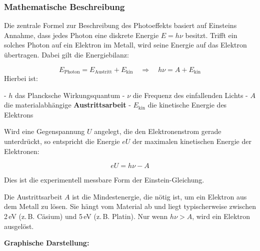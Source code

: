\subsubsection{Mathematische Beschreibung}

Die zentrale Formel zur Beschreibung des Photoeffekts basiert auf Einsteins Annahme, dass jedes Photon eine diskrete Energie \( E = h\nu \) besitzt. Trifft ein solches Photon auf ein Elektron im Metall, wird seine Energie auf das Elektron übertragen. Dabei gilt die Energiebilanz:

\[
E_{\text{Photon}} = E_{\text{Austritt}} + E_{\text{kin}}
\quad\Rightarrow\quad h \nu = A + E_{\text{kin}}
\]
\newpage
\noindent
Hierbei ist:

- \( h \) das Plancksche Wirkungsquantum  
- \( \nu \) die Frequenz des einfallenden Lichts  
- \( A \) die materialabhängige \textbf{Austrittsarbeit}  
- \( E_{\text{kin}} \) die kinetische Energie des Elektrons

Wird eine Gegenspannung \( U \) angelegt, die den Elektronenstrom gerade unterdrückt, so entspricht die Energie \( e U \) der maximalen kinetischen Energie der Elektronen:

\[
eU = h \nu - A
\]

Dies ist die experimentell messbare Form der Einstein-Gleichung.

\vspace{0.5em}
\begin{tcolorbox}[physikbox, title=Was ist die Austrittsarbeit \( A \)?]
	\label{bos:was ist Austrittsarbeit}
	\small
	Die Austrittsarbeit \( A \) ist die Mindestenergie, die nötig ist, um ein Elektron aus dem Metall zu lösen. Sie hängt vom Material ab und liegt typischerweise zwischen 2\,eV (z.\,B. Cäsium) und 5\,eV (z.\,B. Platin). Nur wenn \( h \nu > A \), wird ein Elektron ausgelöst.
\end{tcolorbox}
\vspace{1em}
\textbf{Graphische Darstellung:}

